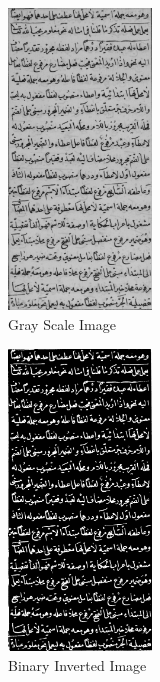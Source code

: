 \begin{figure}[H]
     \centering%
     \begin{subfigure}[b]{0.3\textwidth}
         \centering
         \includegraphics[width=\textwidth, height=8cm]{images/line_step2.jpg}
         \caption{Gray Scale Image}
         \label{fig:test_Gray_Scale}
     \end{subfigure}
     \hfill
      \begin{subfigure}[b]{0.3\textwidth}
         \centering
         \includegraphics[width=\textwidth, height=8cm]{images/line_step3.png}
         \caption{Binary Inverted Image}
         \label{fig:test_Binary}
     \end{subfigure}
     \hfill%
      \begin{subfigure}[b]{0.3\textwidth}

\end{subfigure}
\end{figure}
